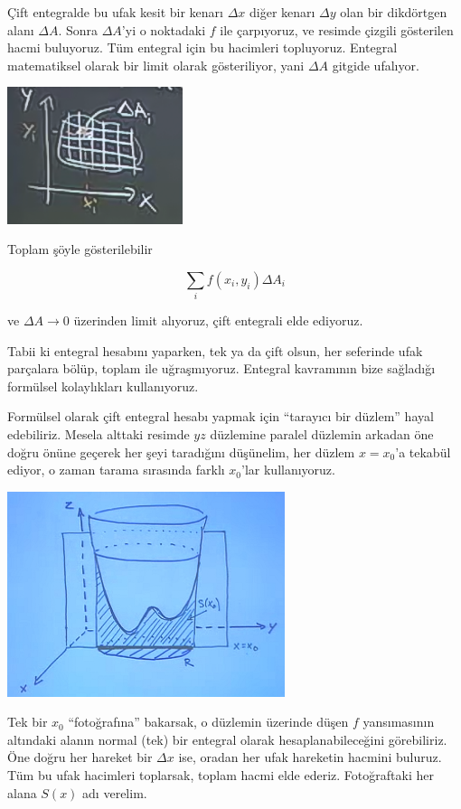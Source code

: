 \documentclass[12pt,fleqn]{article}\usepackage{../../common}
\begin{document}
Çift entegralde bu ufak kesit bir kenarı $\Delta x$ diğer kenarı $\Delta y$ olan
bir dikdörtgen alanı $\Delta A$. Sonra $\Delta A$'yi o noktadaki $f$ ile
çarpıyoruz, ve resimde çizgili gösterilen hacmi buluyoruz. Tüm entegral için bu
hacimleri topluyoruz. Entegral matematiksel olarak bir limit olarak
gösteriliyor, yani $\Delta A$ gitgide ufalıyor.

\includegraphics[height=4cm]{16_4.png}

Toplam şöyle gösterilebilir

$$ \sum_i f(x_i,y_i) \Delta A_i $$

ve $\Delta A \to 0$ üzerinden limit alıyoruz, çift entegrali elde ediyoruz. 

Tabii ki entegral hesabını yaparken, tek ya da çift olsun, her seferinde ufak
parçalara bölüp, toplam ile uğraşmıyoruz. Entegral kavramının bize sağladığı
formülsel kolaylıkları kullanıyoruz.

Formülsel olarak çift entegral hesabı yapmak için ``tarayıcı bir düzlem'' hayal
edebiliriz. Mesela alttaki resimde $yz$ düzlemine paralel düzlemin arkadan öne
doğru önüne geçerek her şeyi taradığını düşünelim, her düzlem $x=x_0$'a tekabül
ediyor, o zaman tarama sırasında farklı $x_0$'lar kullanıyoruz.

\includegraphics[height=6cm]{16_5.png}

Tek bir $x_0$ ``fotoğrafına'' bakarsak, o düzlemin üzerinde düşen $f$
yansımasının altındaki alanın normal (tek) bir entegral olarak
hesaplanabileceğini görebiliriz. Öne doğru her hareket bir $\Delta x$ ise,
oradan her ufak hareketin hacmini buluruz. Tüm bu ufak hacimleri toplarsak,
toplam hacmi elde ederiz. Fotoğraftaki her alana $S(x)$ adı verelim.
\end{document}
